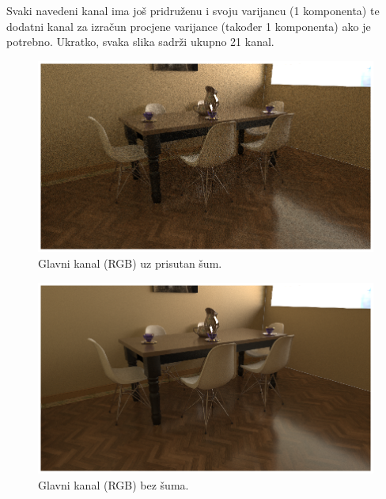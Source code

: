 \documentclass[times, utf8, seminar, numeric]{fer}
\begin{document}
Svaki navedeni kanal ima još pridruženu i svoju varijancu (1 komponenta) te dodatni kanal za
izračun procjene varijance (također 1 komponenta) ako je potrebno. Ukratko, svaka slika
sadrži ukupno 21 kanal.

\begin{samepage}
\begin{figure}[H]
\centering
\includegraphics[width=\textwidth]{noisy_color.png}
\caption{Glavni kanal (RGB) uz prisutan šum.}
\label{fig:noisy_color}
\end{figure}

\begin{figure}[H]
\centering
\includegraphics[width=\textwidth]{reference_color.png}
\caption{Glavni kanal (RGB) bez šuma.}
\label{fig:ref_color}
\end{figure}
\end{samepage}
\end{document}
